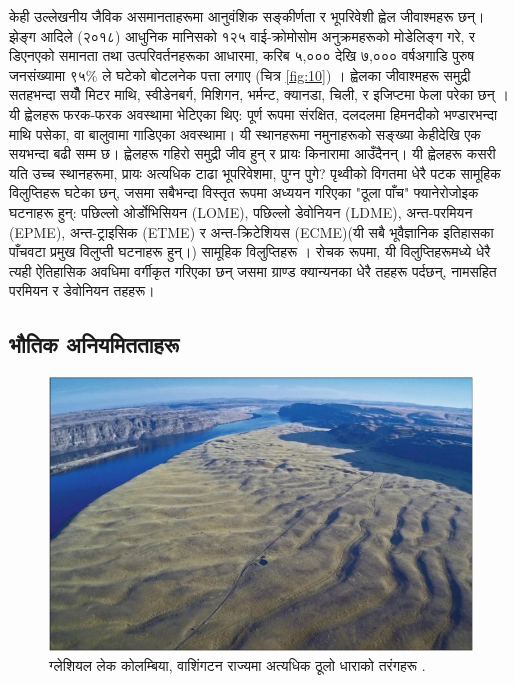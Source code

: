 \documentclass[10pt,twocolumn,letterpaper]{article}
\begin{document}
केही उल्लेखनीय जैविक असमानताहरूमा आनुवंशिक सङ्कीर्णता र भूपरिवेशी ह्वेल जीवाश्महरू छन्। झेङ्ग आदिले (२०१८) आधुनिक मानिसको १२५ वाई-क्रोमोसोम अनुक्रमहरूको मोडेलिङ्ग गरे, र डिएनएको समानता तथा उत्परिवर्तनहरूका आधारमा, करिब ५,००० देखि ७,००० वर्षअगाडि पुरुष जनसंख्यामा ९५\% ले घटेको बोटलनेक पत्ता लगाए (चित्र \ref{fig:10}) \cite{62}। ह्वेलका जीवाश्महरू समुद्री सतहभन्दा सयौँ मिटर माथि, स्वीडेनबर्ग, मिशिगन, भर्मन्ट, क्यानडा, चिली, र इजिप्टमा फेला परेका छन् \cite{63,64,65,66}। यी ह्वेलहरू फरक-फरक अवस्थामा भेटिएका थिए: पूर्ण रूपमा संरक्षित, दलदलमा हिमनदीको भण्डारभन्दा माथि पसेका, वा बालुवामा गाडिएका अवस्थामा। यी स्थानहरूमा नमुनाहरूको सङ्ख्या केहीदेखि एक सयभन्दा बढी सम्म छ। ह्वेलहरू गहिरो समुद्री जीव हुन् र प्रायः किनारामा आउँदैनन्। यी ह्वेलहरू कसरी यति उच्च स्थानहरूमा, प्रायः अत्यधिक टाढा भूपरिवेशमा, पुग्न पुगे?
पृथ्वीको विगतमा धेरै पटक सामूहिक विलुप्तिहरू  घटेका छन्, जसमा सबैभन्दा विस्तृत रूपमा अध्ययन गरिएका "ठूला पाँच" फ्यानेरोजोइक घटनाहरू हुन्: पछिल्लो ओर्डोभिसियन (LOME), पछिल्लो डेवोनियन (LDME), अन्त-परमियन (EPME), अन्त-ट्राइसिक (ETME) र अन्त-क्रिटेशियस (ECME)(यी सबै भूवैज्ञानिक इतिहासका पाँचवटा प्रमुख विलुप्ती घटनाहरू हुन्।) सामूहिक विलुप्तिहरू \cite{88,89}। रोचक रूपमा, यी विलुप्तिहरूमध्ये धेरै त्यही ऐतिहासिक अवधिमा वर्गीकृत गरिएका छन् जसमा ग्राण्ड क्यान्यनका धेरै तहहरू पर्दछन्, नामसहित परमियन र डेवोनियन तहहरू।

\subsection{भौतिक अनियमितताहरू}

\begin{figure}[b]
\begin{center}
   \includegraphics[width=1\linewidth]{columbia.jpg}
\end{center}
   \caption{ग्लेशियल लेक कोलम्बिया, वाशिंगटन राज्यमा अत्यधिक ठूलो धाराको तरंगहरू \cite{80}.}
\label{fig:11}
\label{fig:onecol}
\end{figure}
\end{document}
